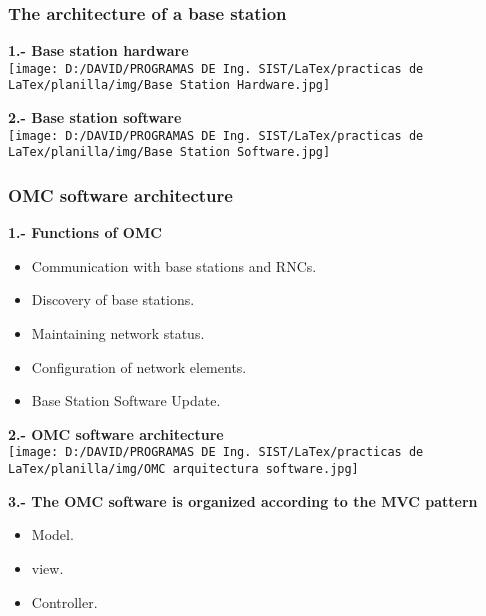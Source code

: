 \documentclass[11pt]{beamer}
\begin{document}
\begin{frame}
\frametitle{The architecture of a base station}
\textbf{1.- Base station hardware}\\
\texttt{[image: D:/DAVID/PROGRAMAS DE Ing. SIST/LaTex/practicas de LaTex/planilla/img/Base Station Hardware.jpg]}  
\end{frame}
\begin{frame}
\textbf{2.- Base station software}\\
\texttt{[image: D:/DAVID/PROGRAMAS DE Ing. SIST/LaTex/practicas de LaTex/planilla/img/Base Station Software.jpg]} 
\end{frame}

\begin{frame}
\frametitle{OMC software architecture}
\textbf{1.- Functions of OMC}\\
\begin {itemize}
\item Communication with base stations and RNCs.
\item Discovery of base stations.
\item Maintaining network status.
\item Configuration of network elements.
\item Base Station Software Update.
\end{itemize} 


\textbf{2.- OMC software architecture}\\
\texttt{[image: D:/DAVID/PROGRAMAS DE Ing. SIST/LaTex/practicas de LaTex/planilla/img/OMC arquitectura software.jpg]} 
\end{frame}
\textbf{3.- The OMC software is organized according to the MVC pattern}\\
\begin {itemize}
\item Model.\\
\item view.\\
\item Controller.\\
\end{itemize} 

\end{document}
